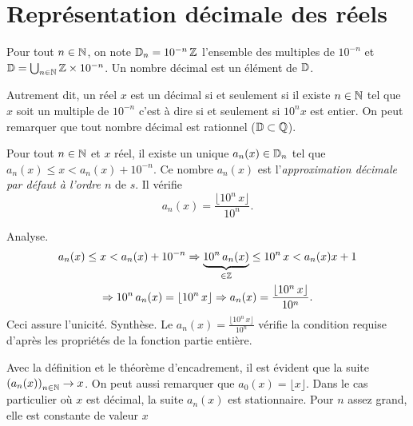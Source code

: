 \section{Représentation décimale des réels}
\begin{defi}
  Pour tout $n\in \mathbb{N}$, on note $\mathbb{D}_n = 10^{-n}\,\mathbb{Z}$ l'ensemble des multiples de $10^{-n}$ et $\mathbb{D} = \bigcup_{n\in \mathbb{N}}\mathbb{Z} \times 10^{-n}$. Un nombre décimal est un élément de $\mathbb{D}$.
\end{defi}
Autrement dit, un réel $x$ est un décimal si et seulement si il existe $n\in \mathbb{N}$ tel que $x$ soit un multiple de $10^{-n}$ c'est à dire si et seulement si $10^{n}x$ est entier. On peut remarquer que tout nombre décimal est rationnel ($\mathbb{D} \subset \mathbb{Q}$).\newline
{} 
\begin{propn} \label{appdec}
Pour tout $n\in \mathbb{N}$ et $x$ réel, il existe un unique $a_n(x)\in \mathbb{D}_n$ tel que $a_n(x)\leq x < a_n(x) + 10^{-n}$.\newline
Ce nombre $a_n(x)$ est l'\emph{approximation décimale par défaut à l'ordre $n$} de $s$. Il vérifie
\[
 a_n(x) = \frac{\lfloor10^n\, x\rfloor }{10^n}.
\]
\end{propn}
\begin{demo}
 Analyse. 
\begin{multline*}
 a_n(x)\leq x < a_n(x) + 10^{-n} \Rightarrow \underset{\in \mathbb{Z}}{\underbrace{10^n\,a_n(x)}}\leq 10^n\,x < a_n(x)x + 1 \\
 \Rightarrow 10^n\,a_n(x) = \lfloor 10^n\,x \rfloor \Rightarrow a_n(x) = \frac{\lfloor 10^n\,x \rfloor}{10^n}.
\end{multline*}
Ceci assure l'unicité.\newline
Synthèse. Le $a_n(x) = \frac{\lfloor 10^n\,x \rfloor}{10^n}$ vérifie la condition requise d'après les propriétés de la fonction partie entière. 
\end{demo}
\begin{rems}
 Avec la définition et le théorème d'encadrement, il est évident que la suite $\left( a_n(x) \right)_{n \in \mathbb{N}} \rightarrow x$.\newline
 On peut aussi remarquer que $a_0(x) = \lfloor x \rfloor$.\newline
 Dans le cas particulier où $x$ est décimal, la suite $a_n(x)$ est stationnaire. Pour $n$ assez grand, elle est constante de valeur $x$
\end{rems}

